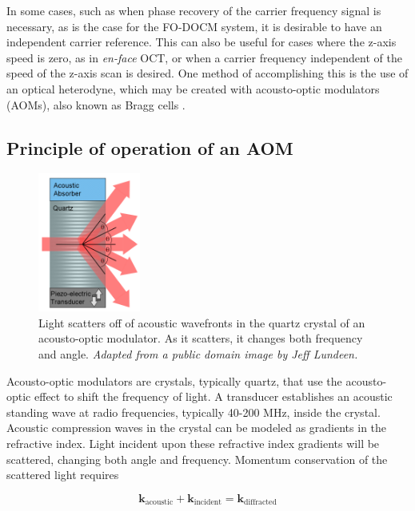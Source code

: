 In some cases, such as when phase recovery of the carrier frequency signal is necessary, as is the case for the FO-DOCM system, it is desirable to have an independent carrier reference. This can also be useful for cases where the z-axis speed is zero, as in {\em en-face} OCT, or when a carrier frequency independent of the speed of the z-axis scan is desired. One method of accomplishing this is the use of an optical heterodyne, which may be created with acousto-optic modulators (AOMs), also known as Bragg cells \cite{bouma} \cite{hitzenberger}.

\subsection{Principle of operation of an AOM}

\begin{figure}[h!]
\centering
\includegraphics[width=0.3\textwidth]{Images/Background/aom.png}
\caption[Light scatters off of acoustic wavefronts in an acousto-optic modulator.]{Light scatters off of acoustic wavefronts in the quartz crystal of an acousto-optic modulator. As it scatters, it changes both frequency and angle. {\em Adapted from a public domain image by Jeff Lundeen.}}
\end{figure}

Acousto-optic modulators are crystals, typically quartz, that use the acousto-optic effect to shift the frequency of light. A transducer establishes an acoustic standing wave at radio frequencies, typically 40-200 MHz, inside the crystal. Acoustic compression waves in the crystal can be modeled as gradients in the refractive index. Light incident upon these refractive index gradients will be scattered, changing both angle and frequency. Momentum conservation of the scattered light requires

\begin{equation}
\mathbf{k}_{\mathrm{acoustic}} + \mathbf{k}_{\mathrm{incident}} = \mathbf{k}_{\mathrm{diffracted}}
\end{equation}

